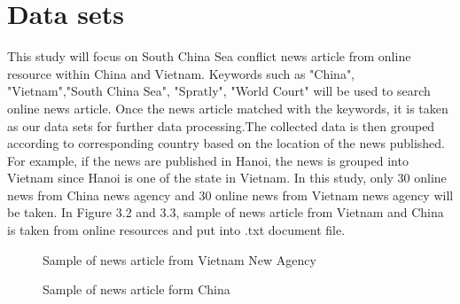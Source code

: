\documentclass[twoside]{utmthesis}
\begin{document}
\section{Data sets}
This study will focus on South China Sea conflict news article from online resource within China and Vietnam. Keywords such as "China", "Vietnam","South China Sea", "Spratly", "World Court" will be used to search online news article. Once the news article matched with the keywords, it is taken as our data sets for further data processing.The collected data is then grouped according to corresponding country based on the location of the news published. For example, if the news are published in Hanoi, the news is grouped into Vietnam since Hanoi is one of the state in Vietnam. In this study, only 30 online news from China news agency and 30 online news from Vietnam news agency will be taken. In Figure 3.2 and 3.3, sample of news article from Vietnam and China is taken from online resources and put into .txt document file.          
\begin{figure}[H]
	\centering
	\caption{Sample of news article from Vietnam New Agency}
	\label{fig:vietnamnews}
\end{figure}
\vspace{-1cm}
\begin{figure}[H]
	\centering
	\caption{Sample of news article form China}
	\label{fig:chinanews}
\end{figure}
\end{document}
